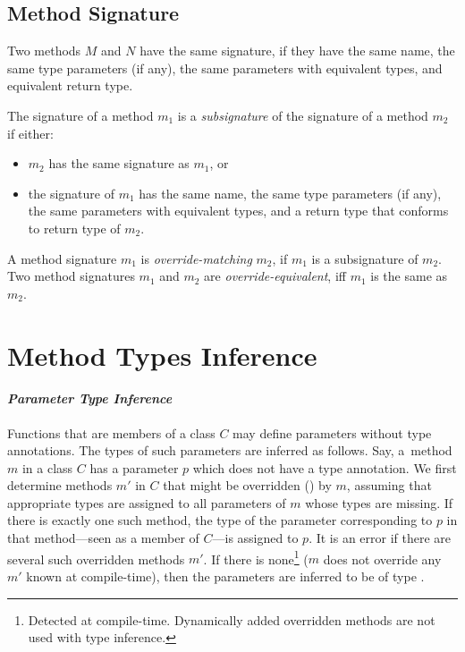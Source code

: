 \subsection{Method Signature}
\label{sec:method-signature}

Two methods $M$ and $N$ have the same signature, if they have the same name, the same type parameters (if any), the same parameters with equivalent types, and equivalent return type. 

The signature of a method $m_1$ is a {\em subsignature} of the signature of a method $m_2$ if either:
\begin{itemize}
\item $m_2$ has the same signature as $m_1$, or
\item the signature of $m_1$ has the same name, the same type parameters (if any), the same parameters with equivalent types, and a return type that conforms to return type of $m_2$. 
\end{itemize}

A method signature $m_1$ is {\em override-matching} $m_2$, if $m_1$ is a subsignature of $m_2$. Two method signatures $m_1$ and $m_2$ are {\em override-equivalent}, iff $m_1$ is the same as $m_2$. 






\section{Method Types Inference}
\label{sec:method-types-inference}

\paragraph{\em Parameter Type Inference}
Functions that are members of a class $C$ may define parameters without type annotations. The types of such parameters are inferred as follows. Say, a~method $m$ in a class $C$ has a parameter $p$ which does not have a type annotation. We first determine methods $m'$ in $C$ that might be overridden () by $m$, assuming that appropriate types are assigned to all parameters of $m$ whose types are missing. If there is exactly one such method, the type of the parameter corresponding to $p$ in that method---seen as a member of $C$---is assigned to $p$. It is an error if there are several such overridden methods $m'$. If there is none\footnote{Detected at compile-time. Dynamically added overridden methods are not used with type inference.} ($m$ does not override any $m'$ known at compile-time), then the parameters are inferred to be of type .

